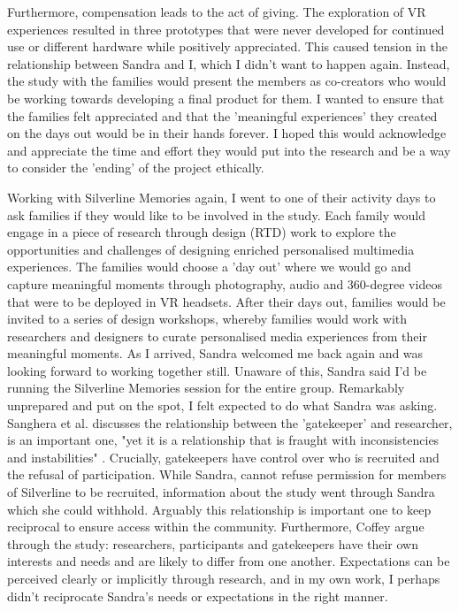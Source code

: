 Furthermore, compensation leads to the act of giving. The exploration of VR experiences resulted in three prototypes that were never developed for continued use or different hardware while positively appreciated. This caused tension in the relationship between Sandra and I, which I didn't want to happen again. Instead, the study with the families would present the members as co-creators who would be working towards developing a final product for them. I wanted to ensure that the families felt appreciated and that the 'meaningful experiences' they created on the days out would be in their hands forever. I hoped this would acknowledge and appreciate the time and effort they would put into the research and be a way to consider the 'ending' of the project ethically.

Working with Silverline Memories again, I went to one of their activity days to ask families if they would like to be involved in the study. Each family would engage in a piece of research through design (RTD) \citep{zimmerman_research_2007} work to explore the opportunities and challenges of designing enriched personalised multimedia experiences. The families would choose a 'day out' where we would go and capture meaningful moments through photography, audio and 360-degree videos that were to be deployed in VR headsets. After their days out, families would be invited to a series of design workshops, whereby families would work with researchers and designers to curate personalised media experiences from their meaningful moments. As I arrived, Sandra welcomed me back again and was looking forward to working together still. Unaware of this, Sandra said I'd be running the Silverline Memories session for the entire group. Remarkably unprepared and put on the spot, I felt expected to do what Sandra was asking. Sanghera et al. discusses the relationship between the 'gatekeeper' and researcher, is an important one, "yet it is a relationship that is fraught with inconsistencies and instabilities" \cite{sanghera_methodological_2008}. Crucially, gatekeepers have control over who is recruited and the refusal of participation. While Sandra, cannot refuse permission for members of Silverline to be recruited, information about the study went through Sandra which she could withhold. Arguably this relationship is important one to keep reciprocal to ensure access within the community. Furthermore, Coffey argue through the study: researchers, participants and gatekeepers have their own interests and needs and are likely to differ from one another. Expectations can be perceived clearly or implicitly through research, and in my own work, I perhaps didn't reciprocate Sandra's needs or expectations in the right manner. 

